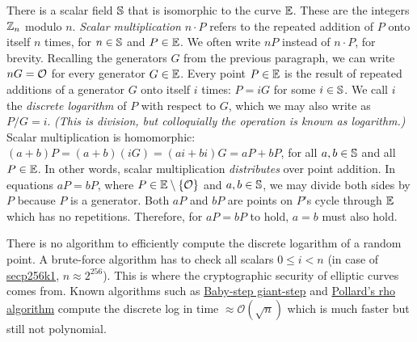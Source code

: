 There is a scalar field $\mathbb{S}$ that is isomorphic to the curve $\mathbb{E}$.
These are the integers $\mathbb{Z}_n$ modulo $n$.
%
\emph{Scalar multiplication} $n \cdot P$ refers to the repeated addition of $P$ onto itself $n$ times,
for $n \in \mathbb{S}$ and $P \in \mathbb{E}$.
We often write $nP$ instead of $n \cdot P$, for brevity.
%
Recalling the generators $G$ from the previous paragraph,
we can write $nG = \mathcal{O}$ for every generator $G \in \mathbb{E}$.
Every point $P \in \mathbb{E}$ is the result of repeated additions of a generator $G$
onto itself $i$ times: $P = iG$ for some $i \in \mathbb{S}$.
We call $i$ the \emph{discrete logarithm} of $P$ with respect to $G$,
which we may also write as $P / G = i$.
\emph{(This is division, but colloquially the operation is known as logarithm.)}
%
Scalar multiplication is homomorphic: $(a + b)P = (a + b)(iG) = (ai + bi)G = aP + bP$,
for all $a, b \in \mathbb{S}$ and all $P \in \mathbb{E}$.
In other words, scalar multiplication \emph{distributes} over point addition.
%
In equations $aP = bP$,
where $P \in \mathbb{E} \setminus \{ \mathcal{O} \}$ and $a, b \in \mathbb{S}$,
we may divide both sides by $P$ because $P$ is a generator.
Both $aP$ and $bP$ are points on $P$'s cycle through $\mathbb{E}$ which has no repetitions.
Therefore, for $aP = bP$ to hold, $a = b$ must also hold.

There is no algorithm to efficiently compute the discrete logarithm of a random point.
A brute-force algorithm has to check all scalars $0 \leq i < n$
(in case of \href{https://en.bitcoin.it/wiki/Secp256k1}{secp256k1}, $n \approx 2^{256}$).
This is where the cryptographic security of elliptic curves comes from.
%
Known algorithms such as \href{https://en.wikipedia.org/wiki/Baby-step\_giant-step}{Baby-step giant-step} and
\href{https://en.wikipedia.org/wiki/Pollard\%27s\_rho\_algorithm\_for\_logarithms}{Pollard's rho algorithm}
compute the discrete log in time $\approx \mathcal{O}(\sqrt{n})$ which is much faster but still not polynomial.
